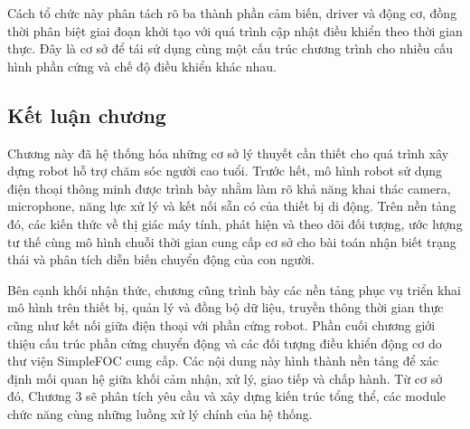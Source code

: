 Cách tổ chức này phân tách rõ ba thành phần cảm biến, driver và động cơ, đồng thời phân biệt giai đoạn khởi tạo với quá trình cập nhật điều khiển theo thời gian thực. Đây là cơ sở để tái sử dụng cùng một cấu trúc chương trình cho nhiều cấu hình phần cứng và chế độ điều khiển khác nhau.

\subsection{Kết luận chương}

Chương này đã hệ thống hóa những cơ sở lý thuyết cần thiết cho quá trình xây dựng robot hỗ trợ chăm sóc người cao tuổi. Trước hết, mô hình robot sử dụng điện thoại thông minh được trình bày nhằm làm rõ khả năng khai thác camera, microphone, năng lực xử lý và kết nối sẵn có của thiết bị di động. Trên nền tảng đó, các kiến thức về thị giác máy tính, phát hiện và theo dõi đối tượng, ước lượng tư thế cùng mô hình chuỗi thời gian cung cấp cơ sở cho bài toán nhận biết trạng thái và phân tích diễn biến chuyển động của con người.

Bên cạnh khối nhận thức, chương cũng trình bày các nền tảng phục vụ triển khai mô hình trên thiết bị, quản lý và đồng bộ dữ liệu, truyền thông thời gian thực cũng như kết nối giữa điện thoại với phần cứng robot. Phần cuối chương giới thiệu cấu trúc phần cứng chuyển động và các đối tượng điều khiển động cơ do thư viện SimpleFOC cung cấp. Các nội dung này hình thành nền tảng để xác định mối quan hệ giữa khối cảm nhận, xử lý, giao tiếp và chấp hành. Từ cơ sở đó, Chương 3 sẽ phân tích yêu cầu và xây dựng kiến trúc tổng thể, các module chức năng cùng những luồng xử lý chính của hệ thống.
